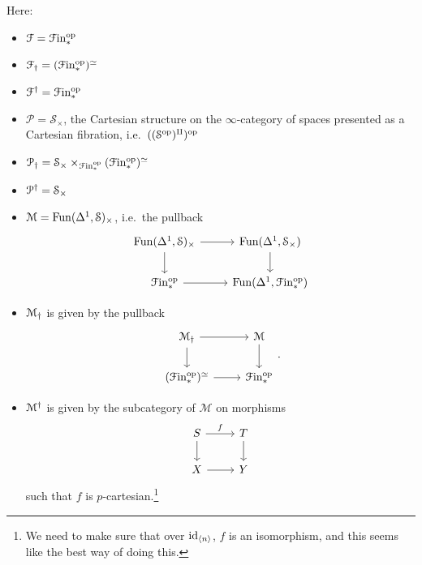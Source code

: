 \documentclass[main.tex]{subfiles}
\begin{document}
Here:
\begin{itemize}
  \item $\mathcal{F} = \mathcal{F}\mathrm{in}_{*}^{\mathrm{op}}$

  \item $\mathcal{F}_{\dagger} = (\mathcal{F}\mathrm{in}_{*}^{\mathrm{op}})^{\simeq}$

  \item $\mathcal{F}^{\dagger} = \mathcal{F}\mathrm{in}_{*}^{\mathrm{op}}$

  \item $\mathcal{P} = \mathcal{S}_{\times}$, the Cartesian structure on the $\infty$-category of spaces presented as a Cartesian fibration, i.e.\ $((\mathcal{S}^{\mathrm{op}})^{\amalg})^{\mathrm{op}}$

  \item $\mathcal{P}_{\dagger} = \mathcal{S}_{\times} \times_{\mathcal{F}\mathrm{in}_{*}^{\mathrm{op}}} (\mathcal{F}\mathrm{in}_{*}^{\mathrm{op}})^{\simeq}$

  \item $\mathcal{P}^{\dagger} = \mathcal{S}_{\times}$

  \item $\mathcal{M} = \mathrm{Fun}(\Delta^{1}, \mathcal{S})_{\times}$, i.e.\ the pullback
    \begin{equation*}
      \begin{tikzcd}
        \Fun(\Delta^{1}, \mathcal{S})_{\times}
        \arrow[r]
        \arrow[d]
        & \Fun(\Delta^{1}, \mathcal{S}_{\times})
        \arrow[d]
        \\
        \Finp\op
        \arrow[r]
        & \Fun(\Delta^{1}, \Finp\op)
      \end{tikzcd}
    \end{equation*}

   \item $\mathcal{M}_{\dagger}$ is given by the pullback
    \begin{equation*}
      \begin{tikzcd}
        \mathcal{M}\downdag
        \arrow[r]
        \arrow[d]
        & \mathcal{M}
        \arrow[d]
        \\
        (\Finp\op)^{\simeq}
        \arrow[r]
        & \Finp\op
      \end{tikzcd}.
    \end{equation*}

  \item $\mathcal{M}^{\dagger}$ is given by the subcategory of $\mathcal{M}$ on morphisms
    \begin{equation*}
      \begin{tikzcd}
        S
        \arrow[r, "f"]
        \arrow[d]
        & T
        \arrow[d]
        \\
        X
        \arrow[r]
        & Y
      \end{tikzcd}
    \end{equation*}
    such that $f$ is $p$-cartesian.\footnote{We need to make sure that over $\mathrm{id}_{\langle n \rangle}$, $f$ is an isomorphism, and this seems like the best way of doing this.}
\end{itemize}
\end{document}
